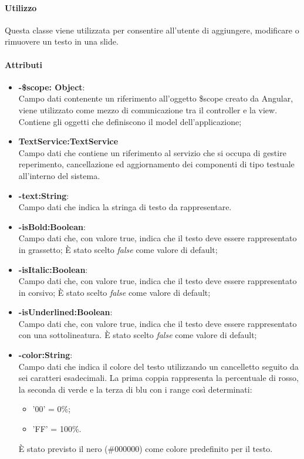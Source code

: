 \paragraph{Utilizzo}
Questa classe viene utilizzata per consentire all'utente di aggiungere, modificare o rimuovere un testo in una slide.

\paragraph{Attributi}
\begin{itemize}
	\item \textbf{-\$scope: Object}:\\
	Campo dati contenente un riferimento all'oggetto \$scope creato da Angular, viene utilizzato come mezzo di comunicazione tra il controller e la view. Contiene gli oggetti che definiscono il model dell'applicazione;
	\item  \textbf{TextService:TextService}\\
	Campo dati che contiene un riferimento al servizio che si occupa di gestire reperimento, cancellazione ed aggiornamento dei componenti di tipo testuale all'interno del sistema.
	\item\textbf{-text:String}:\\
	Campo dati che indica la stringa di testo da rappresentare.
	\item\textbf{-isBold:Boolean}:\\
	Campo dati che, con valore true, indica che il testo deve essere rappresentato in grassetto; È stato scelto \textit{false} come valore di default;
	\item\textbf{-isItalic:Boolean}:\\
	Campo dati che, con valore true, indica che il testo deve essere rappresentato in corsivo; È stato scelto \textit{false} come valore di default;
	\item\textbf{-isUnderlined:Boolean}:\\
	Campo dati che, con valore true, indica che il testo deve essere rappresentato con una sottolineatura. È stato scelto \textit{false} come valore di default;
	\item\textbf{-color:String}:\\
	Campo dati che indica il colore del testo utilizzando un cancelletto seguito da sei caratteri esadecimali. La prima coppia rappresenta la percentuale di rosso, la seconda di verde e la terza di blu con i range così determinati:
	\begin{itemize}
		\item '00' = 0\%;
		\item 'FF' = 100\%.
	\end{itemize}
	È stato previsto il nero (\#000000) come colore predefinito per il testo.
	
	
\end{itemize}

